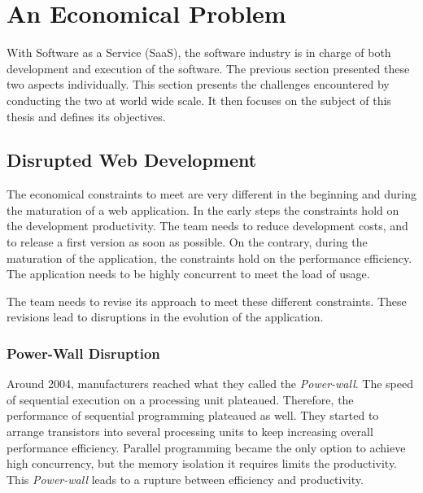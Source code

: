 \section{An Economical Problem} \label{chapter2:problem-statement}

With Software as a Service (SaaS), the software industry is in charge of both development and execution of the software.
The previous section presented these two aspects individually.
This section presents the challenges encountered by conducting the two at world wide scale.
It then focuses on the subject of this thesis and defines its objectives.

\subsection{Disrupted Web Development}

The economical constraints to meet are very different in the beginning and during the maturation of a web application.
In the early steps the constraints hold on the development productivity.
The team needs to reduce development costs, and to release a first version as soon as possible.
On the contrary, during the maturation of the application, the constraints hold on the performance efficiency.
The application needs to be highly concurrent to meet the load of usage.

The team needs to revise its approach to meet these different constraints.
These revisions lead to disruptions in the evolution of the application.

\subsubsection{Power-Wall Disruption}


Around 2004, manufacturers reached what they called the \textit{Power-wall}.
The speed of sequential execution on a processing unit plateaued.
Therefore, the performance of sequential programming plateaued as well.
They started to arrange transistors into several processing units to keep increasing overall performance efficiency.
Parallel programming became the only option to achieve high concurrency, but the memory isolation it requires limits the productivity.
This \textit{Power-wall} leads to a rupture between efficiency and productivity.

